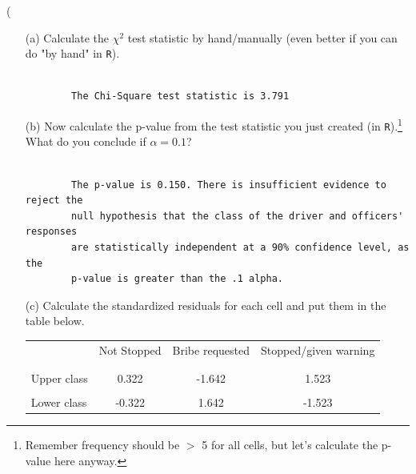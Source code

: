 \left( \documentclass[12pt,letterpaper]{article}
\begin{document}
\begin{enumerate}
	
	\item [(a)]
	Calculate the $\chi^2$ test statistic by hand/manually (even better if you can do "by hand" in \texttt{R}).\\
	
	\begin{verbatim}
		
		The Chi-Square test statistic is 3.791
	\end{verbatim}
	
	
	\vspace{3cm}

	
	\item [(b)]
	Now calculate the p-value from the test statistic you just created (in \texttt{R}).\footnote{Remember frequency should be $>$ 5 for all cells, but let's calculate the p-value here anyway.}  What do you conclude if $\alpha = 0.1$?\\
	
		\begin{verbatim}
		
		The p-value is 0.150. There is insufficient evidence to reject the 
		null hypothesis that the class of the driver and officers' responses 
		are statistically independent at a 90% confidence level, as the 
		p-value is greater than the .1 alpha. 
	\end{verbatim}
	
	
	
	\vspace{2cm}
	\item [(c)] Calculate the standardized residuals for each cell and put them in the table below.
	\vspace{1cm}
	
	\begin{table}[h]
		\centering
		\begin{tabular}{l | c c c }
			& Not Stopped & Bribe requested & Stopped/given warning \\
			\\[-1.8ex] 
			\hline \\[-1.8ex]
			Upper class  &  0.322&-1.642  & 1.523 \\
			\\
			Lower class &  -0.322& 1.642  & -1.523  \\
			
		\end{tabular}
	\end{table}
		
	

\end{enumerate}
\end{document}
